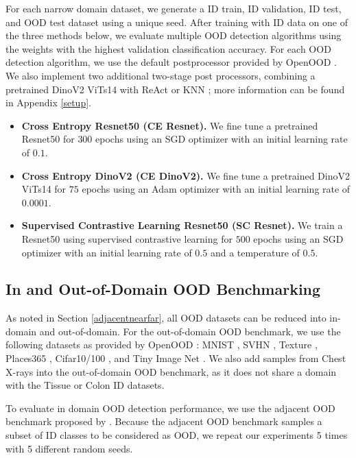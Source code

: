 \documentclass[letterpaper]{article} %
\theoremstyle{plain}
\theoremstyle{definition}
\theoremstyle{remark}
\begin{document}
For each narrow domain dataset, we generate a ID train, ID validation, ID test, and OOD test dataset using a unique seed. After training with ID data on one of the three methods below, we evaluate multiple OOD detection algorithms using the weights with the highest validation classification accuracy. For each OOD detection algorithm, we use the default postprocessor provided by OpenOOD \citep{zhang2023openood}. We also implement two additional two-stage post processors, combining a pretrained DinoV2 ViTs14 \citep{oquab2023dinov2} with ReAct \citep{sun2021react} or KNN \citep{sun2022out}; more information can be found in Appendix \ref{setup}.
\begin{itemize}
\item \textbf{Cross Entropy Resnet50 (CE Resnet).} We fine tune a pretrained Resnet50 for $300$ epochs using an SGD optimizer with an initial learning rate of $0.1$. 
\item \textbf{Cross Entropy DinoV2 (CE DinoV2).} We fine tune a pretrained DinoV2 ViTs14 for $75$ epochs using an Adam optimizer with an initial learning rate of $0.0001$.
\item \textbf{Supervised Contrastive Learning Resnet50 (SC Resnet).} We train a Resnet50 using supervised contrastive learning for $500$ epochs using an SGD optimizer with an initial learning rate of $0.5$ and a temperature of $0.5$. 
\end{itemize}







\subsection{In and Out-of-Domain OOD Benchmarking}
\label{domainbench}
As noted in Section \ref{adjacentnearfar}, all OOD datasets can be reduced into in-domain and out-of-domain. For the out-of-domain OOD benchmark, we use the following datasets as provided by OpenOOD \cite{zhang2023openood}: MNIST \citep{lecun1998gradient}, SVHN \citep{netzer2011reading}, Texture \citep{cimpoi2014describing}, Places365 \citep{zhou2017places}, Cifar10/100 \citep{cifar10}, and Tiny Image Net \citep{deng2009imagenet}. We also add samples from Chest X-rays \citep{yang2023medmnist} into the out-of-domain OOD benchmark, as it does not share a domain with the Tissue or Colon ID datasets. 

To evaluate in domain OOD detection performance, we use the adjacent OOD benchmark proposed by \cite{yangcan}. Because the adjacent OOD benchmark samples a subset of ID classes to be considered as OOD, we repeat our experiments 5 times with 5 different random seeds.  
\end{document}

